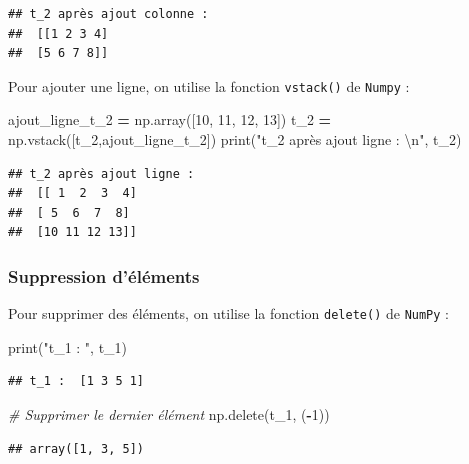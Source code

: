 \documentclass[
  12pt,
]{book}
\newenvironment{Shaded}{\begin{snugshade}}{\end{snugshade}}
\newcommand{\BuiltInTok}[1]{#1}
\newcommand{\CharTok}[1]{\textcolor[rgb]{0.31,0.60,0.02}{#1}}
\newcommand{\CommentTok}[1]{\textcolor[rgb]{0.56,0.35,0.01}{\textit{#1}}}
\newcommand{\DecValTok}[1]{\textcolor[rgb]{0.00,0.00,0.81}{#1}}
\newcommand{\NormalTok}[1]{#1}
\newcommand{\OperatorTok}[1]{\textcolor[rgb]{0.81,0.36,0.00}{\textbf{#1}}}
\newcommand{\StringTok}[1]{\textcolor[rgb]{0.31,0.60,0.02}{#1}}
\numberwithin{equation}{section}
\numberwithin{countremarque}{section}
\begin{document}
\begin{lstlisting}
## t_2 après ajout colonne : 
##  [[1 2 3 4]
##  [5 6 7 8]]
\end{lstlisting}

Pour ajouter une ligne, on utilise la fonction \texttt{vstack()} de \texttt{Numpy} :

\begin{Shaded}
\begin{Highlighting}[]
\NormalTok{ajout\_ligne\_t\_2 }\OperatorTok{=}\NormalTok{ np.array([}\DecValTok{10}\NormalTok{, }\DecValTok{11}\NormalTok{, }\DecValTok{12}\NormalTok{, }\DecValTok{13}\NormalTok{])}
\NormalTok{t\_2 }\OperatorTok{=}\NormalTok{ np.vstack([t\_2,ajout\_ligne\_t\_2])}
\BuiltInTok{print}\NormalTok{(}\StringTok{"t\_2 après ajout ligne : }\CharTok{\textbackslash{}n}\StringTok{"}\NormalTok{, t\_2)}
\end{Highlighting}
\end{Shaded}

\begin{lstlisting}
## t_2 après ajout ligne : 
##  [[ 1  2  3  4]
##  [ 5  6  7  8]
##  [10 11 12 13]]
\end{lstlisting}

\subsubsection{Suppression d'éléments}\label{suppression-duxe9luxe9ments-2}

Pour supprimer des éléments, on utilise la fonction \texttt{delete()} de \texttt{NumPy} :

\begin{Shaded}
\begin{Highlighting}[]
\BuiltInTok{print}\NormalTok{(}\StringTok{"t\_1 : "}\NormalTok{, t\_1)}
\end{Highlighting}
\end{Shaded}

\begin{lstlisting}
## t_1 :  [1 3 5 1]
\end{lstlisting}

\begin{Shaded}
\begin{Highlighting}[]
\CommentTok{\# Supprimer le dernier élément}
\NormalTok{np.delete(t\_1, (}\OperatorTok{{-}}\DecValTok{1}\NormalTok{))}
\end{Highlighting}
\end{Shaded}

\begin{lstlisting}
## array([1, 3, 5])
\end{lstlisting}
\end{document}
